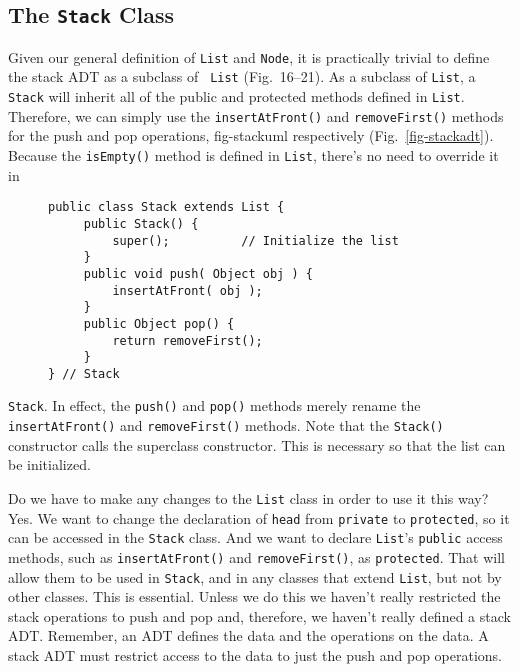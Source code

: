 \subsection{The {\tt Stack} Class}

\noindent Given our general definition of {\tt List} and {\tt Node}, it is
practically trivial to define the stack ADT as a subclass of {\tt
List} (Fig.~16--21).  As a subclass of {\tt List}, a {\tt
Stack} will inherit all of the public and protected methods defined in
{\tt List}. Therefore, we can simply use the {\tt insertAtFront()} and
{\tt removeFirst()} methods for the push and pop operations,
{fig-stackuml}
respectively (Fig.~\ref{fig-stackadt}). Because the {\tt isEmpty()}
method is defined in {\tt List}, there's no need to override it in
\begin{figure}[h]
\jjjprogstart
\begin{jjjlisting}
\begin{lstlisting}
public class Stack extends List {
     public Stack() {
         super();          // Initialize the list
     }
     public void push( Object obj ) {
         insertAtFront( obj );
     }
     public Object pop() {
         return removeFirst();
     }
} // Stack
\end{lstlisting}
\end{jjjlisting}
\end{figure}
{\tt Stack}.  In effect, the {\tt push()} and {\tt pop()} methods
merely rename the {\tt insertAtFront()} and {\tt removeFirst()}
methods. Note that the {\tt Stack()} constructor calls the superclass
constructor. This is necessary so that the list can be initialized.


Do we have to make any changes to the {\tt List} class in order to use
it this way?  Yes.  We want to change the declaration of {\tt head}
from {\tt private} to {\tt protected}, so it can be accessed in the
{\tt Stack} class.  And we want to declare {\tt List}'s {\tt public}
access methods, such as {\tt insertAtFront()} and {\tt removeFirst()},
as {\tt protected}.  That will allow them to be used in {\tt Stack},
and in any classes that extend {\tt List}, but not by other
classes.  This is essential.  Unless we do this we haven't really
restricted the stack operations to push and pop and, therefore, we
haven't really defined a stack ADT.  Remember, an ADT defines the data
and the operations on the data.   A stack ADT must restrict access to
the data to just the push and pop operations.

